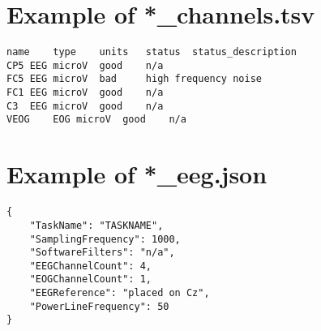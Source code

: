 \documentclass[a4paper,10pt]{article}
\begin{document}
\thispagestyle{empty}

\begin{large}

\section*{Example of *\_channels.tsv}
\begin{lstlisting}[basicstyle=\bf]
name	type	units	status	status_description
CP5	EEG	microV	good	n/a
FC5	EEG	microV	bad     high frequency noise
FC1	EEG	microV	good	n/a
C3	EEG	microV	good	n/a
VEOG	EOG	microV	good	n/a

\end{lstlisting}

\vskip 1cm

\section*{Example of *\_eeg.json}

\begin{lstlisting}[basicstyle=\bf]
{
    "TaskName": "TASKNAME",
    "SamplingFrequency": 1000,
    "SoftwareFilters": "n/a",
    "EEGChannelCount": 4,
    "EOGChannelCount": 1,
    "EEGReference": "placed on Cz",
    "PowerLineFrequency": 50
}

\end{lstlisting}
\end{large}
\end{document}
